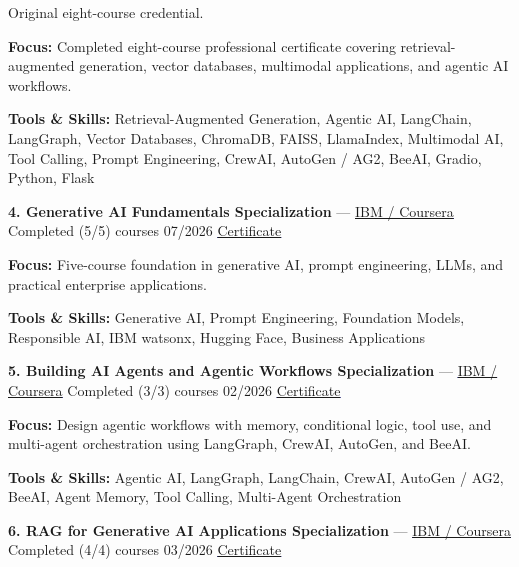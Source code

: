 \documentclass[9pt,letterpaper]{extarticle}
\begin{document}
{\small Original eight-course credential.\par}
\textbf{Focus:} Completed eight-course professional certificate covering retrieval-augmented generation, vector databases, multimodal applications, and agentic AI workflows.\par
{\small\textbf{Tools \& Skills:} Retrieval-Augmented Generation, Agentic AI, LangChain, LangGraph, Vector Databases, ChromaDB, FAISS, LlamaIndex, Multimodal AI, Tool Calling, Prompt Engineering, CrewAI, AutoGen / AG2, BeeAI, Gradio, Python, Flask\par}
\vspace{2pt}
\noindent\textbf{4. Generative AI Fundamentals Specialization} {\small --- \textcolor{blue}{\underline{\href{https://coursera.org/verify/specialization/IPQKDOHF3IV2}{IBM / Coursera}}} \textbar{} Completed (5/5) courses \textbar{} 07/2026 \textbar{} \textcolor{blue}{\underline{\href{https://waseemraza844.github.io/portfolio/certificates/genai/ibm-genai-fundamentals/ibm-genai-fundamentals.pdf}{Certificate}}}}\par
\textbf{Focus:} Five-course foundation in generative AI, prompt engineering, LLMs, and practical enterprise applications.\par
{\small\textbf{Tools \& Skills:} Generative AI, Prompt Engineering, Foundation Models, Responsible AI, IBM watsonx, Hugging Face, Business Applications\par}
\vspace{2pt}
\noindent\textbf{5. Building AI Agents and Agentic Workflows Specialization} {\small --- \textcolor{blue}{\underline{\href{https://coursera.org/verify/specialization/CEVQP0RYI532}{IBM / Coursera}}} \textbar{} Completed (3/3) courses \textbar{} 02/2026 \textbar{} \textcolor{blue}{\underline{\href{https://waseemraza844.github.io/portfolio/certificates/genai/ibm-building-ai-agents/ibm-building-ai-agents.pdf}{Certificate}}}}\par
\textbf{Focus:} Design agentic workflows with memory, conditional logic, tool use, and multi-agent orchestration using LangGraph, CrewAI, AutoGen, and BeeAI.\par
{\small\textbf{Tools \& Skills:} Agentic AI, LangGraph, LangChain, CrewAI, AutoGen / AG2, BeeAI, Agent Memory, Tool Calling, Multi-Agent Orchestration\par}
\vspace{2pt}
\noindent\textbf{6. RAG for Generative AI Applications Specialization} {\small --- \textcolor{blue}{\underline{\href{https://coursera.org/verify/specialization/I7IDRI3160WV}{IBM / Coursera}}} \textbar{} Completed (4/4) courses \textbar{} 03/2026 \textbar{} \textcolor{blue}{\underline{\href{https://waseemraza844.github.io/portfolio/certificates/genai/ibm-rag-applications/ibm-rag-applications.pdf}{Certificate}}}}\par
\end{document}
